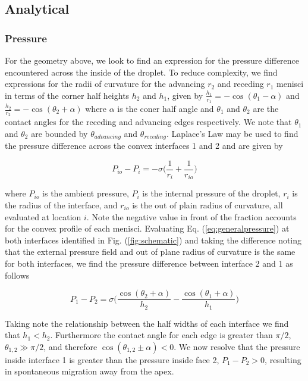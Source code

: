 \documentclass{article}
\begin{document}
\subsection*{Analytical}
\subsubsection*{Pressure}

For the geometry above, we look to find an expression for the pressure difference encountered across the inside of the droplet. To reduce complexity, we find expressions for the radii of curvature for the advancing $r_2$ and receding $r_1$ menisci in terms of the corner half heights $h_2$ and $h_1$, given by
$
\frac{h_1}{r_1} = - \cos(\theta_1 - \alpha)
$
and 
$
\frac{h_2}{r_2} = -\cos(\theta_2 + \alpha)
$
where $\alpha$ is the coner half angle and $\theta_1$ and $\theta_2$ are the contact angles for the receding and advancing edges respectively. We note that $\theta_1$ and $\theta_2$ are bounded by $\theta_{advancing}$ and $\theta_{receding}$. Laplace's Law may be used to find the pressure difference across the convex interfaces 1 and 2 and are given by 

\begin{equation}
	\label{eq:generalpressure}
P_{io} - P_i = -\sigma \Big( \frac{1}{r_i} + \frac{1}{r_{io}} \Big) 
\end{equation} 

\noindent where $P_{io}$ is the ambient pressure, $P_i$ is the internal pressure of the droplet, $r_i$ is the radius of the interface, and $r_{io}$ is the out of plain radius of curvature, all evaluated at location $i$. Note the negative value in front of the fraction accounts for the convex profile of each menisci. Evaluating Eq. (\ref{eq:generalpressure}) at both interfaces identified in Fig. (\ref{fig:schematic}) and taking the difference noting that the external pressure field and out of plane radius of curvature is the same for both interfaces, we find the pressure difference between interface 2 and 1 as follows 

\begin{equation}
\label{eq:pressurediff}
P_1 - P_2 = \sigma \Big(  \frac{\cos(\theta_2 + \alpha)}{h_2} -\frac{\cos(\theta_1 + \alpha)}{h_1} \Big)
\end{equation}
          
\noindent Taking note the relationship between the half widths of each interface we find that $h_1 < h_2$. Furthermore the contact angle for each edge is greater than $\pi/2$, $\theta_{1,2} \gg \pi/2$, and therefore $\cos(\theta_{1,2} \pm \alpha) < 0$. We now resolve that the pressure inside interface 1 is greater than the pressure inside face 2, $P_1 - P_2 > 0$, resulting in spontaneous migration away from the apex.
\end{document}
